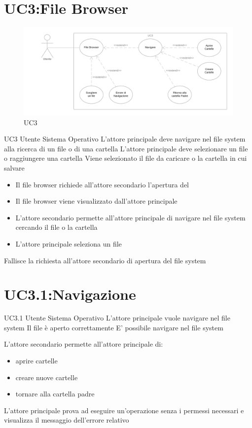 \documentclass[../AnalisideiRequisiti.tex]{subfiles}
\begin{document}
	\section{UC3:File Browser}
	\begin{figure}[H]
		\caption{UC3}
		\centering
		\includegraphics[width=\textwidth]{../img/UC03.png}
	\end{figure}
	\UserCase
	{UC3}
	{Utente}
	{Sistema Operativo}
	{L'attore principale deve navigare nel file system alla ricerca di un file o di una cartella}
	{L'attore principale deve selezionare un file o raggiungere una cartella}
	{Viene selezionato il file da caricare o la cartella in cui salvare}
	{
		\begin{itemize}
			\item{} Il file browser richiede all'attore secondario l'apertura del 
			\item{} Il file browser viene visualizzato dall'attore principale
			\item{} L'attore secondario permette all'attore principale di navigare nel file system cercando il file o la cartella 
			\item{} L'attore principale seleziona un file 
		\end{itemize}
	}
	{Fallisce la richiesta all'attore secondario di apertura del file system }
	
	\section{UC3.1:Navigazione}
	\UserCase
	{UC3.1}
	{Utente}
	{Sistema Operativo}
	{L'attore principale vuole navigare nel file system}
	{Il file  è aperto correttamente}
	{E' possibile navigare nel file system}
	{
		L'attore secondario permette all'attore principale di:
		\begin{itemize}
			\item{} aprire cartelle
			\item{} creare nuove cartelle
			\item{} tornare alla cartella padre
		\end{itemize}
	}
	{L'attore principale prova ad eseguire un'operazione senza i permessi necessari e visualizza il messaggio dell'errore relativo }	
	
\end{document}
